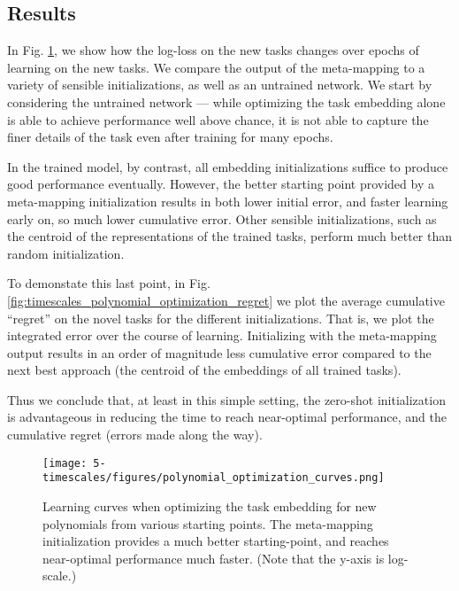 \subsection{Results}
In Fig. \ref{fig:timescales_polynomial_optimization_curves}, we show how the log-loss on the new tasks changes over epochs of learning on the new tasks. We compare the output of the meta-mapping to a variety of sensible initializations, as well as an untrained network. We start by considering the untrained network --- while optimizing the task embedding alone is able to achieve performance well above chance, it is not able to capture the finer details of the task even after training for many epochs. \par
In the trained model, by contrast, all embedding initializations suffice to produce good performance eventually. However, the better starting point provided by a meta-mapping initialization results in both lower initial error, and faster learning early on, so much lower cumulative error. Other sensible initializations, such as the centroid of the representations of the trained tasks, perform much better than random initialization.\par
To demonstate this last point, in Fig. \ref{fig:timescales_polynomial_optimization_regret} we plot the average cumulative ``regret'' on the novel tasks for the different initializations. That is, we plot the integrated error over the course of learning. Initializing with the meta-mapping output results in an order of magnitude less cumulative error compared to the next best approach (the centroid of the embeddings of all trained tasks). \par
Thus we conclude that, at least in this simple setting, the zero-shot initialization is advantageous in reducing the time to reach near-optimal performance, and the cumulative regret (errors made along the way). \par 
\begin{figure}
\centering
\texttt{[image: 5-timescales/figures/polynomial\_optimization\_curves.png]}
\caption[Learning curves when optimizing the task embedding for new polynomials from various starting points.]{Learning curves when optimizing the task embedding for new polynomials from various starting points. The meta-mapping initialization provides a much better starting-point, and reaches near-optimal performance much faster. (Note that the y-axis is log-scale.)} \label{fig:timescales_polynomial_optimization_curves}
\end{figure}

